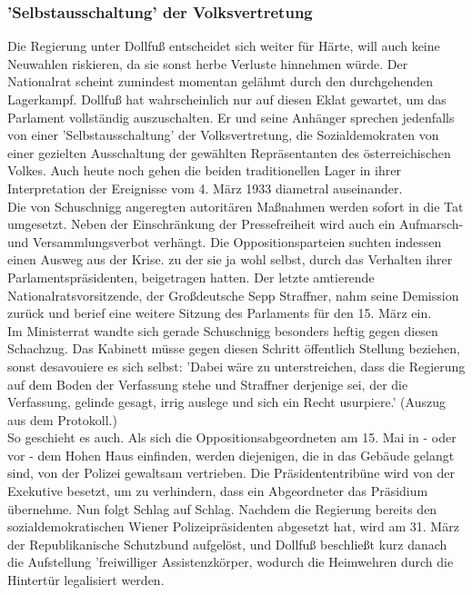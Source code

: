 \documentclass[letterpaper, 12pt]{article}
\let\tempsubsubsection\subsubsection
\renewcommand\subsubsection[1]{\vspace{0cm}\tempsubsubsection{#1}\vspace{0cm}}
\begin{document}
\subsubsection{'Selbstausschaltung' der Volksvertretung}
Die Regierung unter Dollfuß entscheidet sich weiter für Härte, will auch keine Neuwahlen riskieren, da sie sonst herbe Verluste hinnehmen würde. Der Nationalrat scheint zumindest momentan gelähmt durch den durchgehenden Lagerkampf. Dollfuß hat wahrscheinlich nur auf diesen Eklat gewartet, um das Parlament vollständig auszuschalten. Er und seine Anhänger sprechen jedenfalls von einer 'Selbstausschaltung' der Volksvertretung, die Sozialdemokraten von einer gezielten Ausschaltung der gewählten Repräsentanten des österreichischen Volkes. Auch heute noch gehen die beiden traditionellen Lager in ihrer Interpretation der Ereignisse vom 4. März 1933 diametral auseinander. \\
Die von Schuschnigg angeregten autoritären Maßnahmen werden sofort in die Tat umgesetzt. Neben der Einschränkung der Pressefreiheit wird auch ein Aufmarsch- und Versammlungsverbot verhängt. Die Oppositionsparteien suchten indessen einen Ausweg aus der Krise. zu der sie ja wohl selbst, durch das Verhalten ihrer Parlamentspräsidenten, beigetragen hatten. Der letzte amtierende Nationalratsvorsitzende, der Großdeutsche Sepp Straffner, nahm seine Demission zurück und berief eine weitere Sitzung des Parlaments für den 15. März ein. \\
Im Ministerrat wandte sich gerade Schuschnigg besonders heftig gegen diesen Schachzug. Das Kabinett müsse gegen diesen Schritt öffentlich Stellung beziehen, sonst desavouiere es sich selbst: 'Dabei wäre zu unterstreichen, dass die Regierung auf dem Boden der Verfassung stehe und Straffner derjenige sei, der die Verfassung, gelinde gesagt, irrig auslege und sich ein Recht usurpiere.' (Auszug aus dem Protokoll.) \\
So geschieht es auch. Als sich die Oppositionsabgeordneten am 15. Mai in - oder vor - dem Hohen Haus einfinden, werden diejenigen, die in das Gebäude gelangt sind, von der Polizei gewaltsam vertrieben. Die Präsidententribüne wird von der Exekutive besetzt, um zu verhindern, dass ein Abgeordneter das Präsidium übernehme. Nun folgt Schlag auf Schlag. Nachdem die Regierung bereits den sozialdemokratischen Wiener Polizeipräsidenten abgesetzt hat, wird am 31. März der Republikanische Schutzbund aufgelöst, und Dollfuß beschließt kurz danach die Aufstellung 'freiwilliger Assistenzkörper‚ wodurch die Heimwehren durch die Hintertür legalisiert werden. \\
\end{document}
